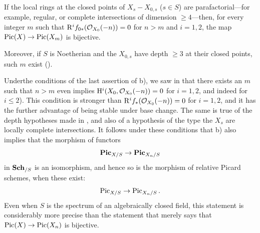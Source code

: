 \begin{corollaire}
\begin{enumeratea}
\item
If the local rings at the closed points of $X_s-X_{0,s}$ ($s\in S$) are \og parafactorial\fg---for example, regular, or complete intersections of dimension $\geq 4$---then, for every integer $m$ such that $\mathrm R^if_{0\ast}(\mathcal O_{X_0}(-n))=0$ for $n>m$ and $i=1,2$, the map $\operatorname{Pic}(X)\to \operatorname{Pic}(X_m)$ is bijective.

Moreover, if $S$ is Noetherian and the $X_{0,s}$ have depth $\geq 3$ at their closed points, such $m$ exist (\cf {}).
\end{enumeratea}
\end{corollaire}

\begin{remarque} \label{XII.4.10}
Under\pageoriginale the conditions of the last assertion of  b), we saw in  that there exists an $m$ such that $n>m$ even implies $\mathrm H^i(X_0, \mathcal O_{X_0}(-n))=0$ for $i=1,2$, and indeed for $i\leq 2$). This condition is stronger than $\mathrm R^if_{\ast}(\mathcal O_{X_0}(-n))=0$ for $i=1,2$, and it has the further advantage of being stable under base change. The same is true of the depth hypotheses made in , and also of a hypothesis of the type \og the $X_s$ are locally complete intersections\fg. It follows under these conditions that  b) also implies that the morphism of functors
\[
\mathbf{Pic}_{X/S}\to \mathbf{Pic}_{X_n/S}
\]
in $\mathbf{Sch}_{/S}$ is an isomorphism, and hence so is the morphism of relative Picard schemes, when these exist:
\[
\operatorname{Pic}_{X/S}\to \operatorname{Pic}_{X_n/S}.
\]
Even when $S$ is the spectrum of an algebraically closed field, this statement is considerably more precise than the statement that merely says that $\operatorname{Pic}(X)\to \operatorname{Pic}(X_n)$ is bijective.


\end{remarque}
